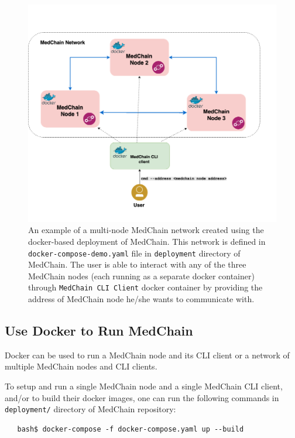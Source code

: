 \begin{figure}[htbp] 
        \centering \includegraphics[width=1\columnwidth]{Images/demo.png}
        \caption{\label{fig:demo-network} 
         An example of a multi-node MedChain network created using the docker-based deployment of MedChain. This network is defined in \texttt{docker-compose-demo.yaml} file in \texttt{deployment} directory of MedChain. The user is able to interact with any of the three MedChain nodes (each running as a separate docker container) through \texttt{MedChain CLI Client} docker container by providing the address of MedChain node he/she wants to communicate with.   
        }
\end{figure}

\subsection{Use Docker to Run MedChain}

Docker can be used to run a MedChain node and its CLI client or a network of multiple MedChain nodes and CLI clients. 

To setup and run a single MedChain node and a single MedChain CLI client, and/or to build their docker images, one can run the following commands in \texttt{deployment/} directory of MedChain repository:

\begin{verbatim}
   bash$ docker-compose -f docker-compose.yaml up --build 
\end{verbatim}

